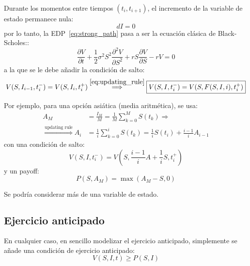 Durante los momentos entre tiempos $(t_i, t_{i+1})$, el incremento de la variable de estado permanece nula:
\[
    dI = 0
\]
por lo tanto, la EDP~\eqref{eq:strong_path} pasa a ser la ecuación clásica de Black-Scholes::
\begin{equation}
    \boxed{\frac{\partial V}{\partial t}  +  \frac{1}{2} \sigma^2 S^2 \frac{\partial^2 V}{\partial S^2} + r S \frac{\partial V}{\partial S} - rV = 0}
\end{equation}
a la que se le debe añadir la condición de salto:
\begin{equation*}
    V(S, I_{i-1}, t^-_i) = V(S, I_i, t^+_i) \overset{\ref{eq:updating_rule}}{\Longrightarrow} \boxed{V(S, I, t_i^-) = V(S, F(S,I,i), t_i^+)}
\end{equation*}

Por ejemplo, para una opción asiática (media aritmética), se usa:
\begin{align*}
    A_M &= \frac{I_M}{M} = \frac{1}{M} \sum_{k=0}^{M} S(t_k) \Rightarrow \\
    \overset{\text{updating rule}}{\Longrightarrow} A_i &= \frac{1}{i} \sum_{k=0}^{i} S(t_k) = \frac{1}{i} S(t_i) + \frac{i-1}{i} A_{i-1}
\end{align*}
con una condición de salto:
\begin{equation*}
    V(S, I, t_i^-) = V(S, \frac{i-1}{i} A + \frac{1}{i} S, t_i^+)
\end{equation*}
y un payoff:
\begin{equation*}
    P(S,A_M) = \max(A_M - S, 0)
\end{equation*}

Se podría considerar más de una variable de estado.




\subsection{Ejercicio anticipado}
En cualquier caso, en sencillo modelizar el ejercicio anticipado, simplemente se añade una condición de ejercicio anticipado:
\begin{equation*}
    V(S, I, t) \geq P(S, I)
\end{equation*}







